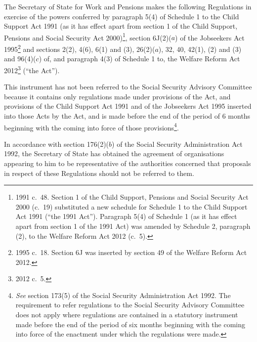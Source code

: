 \documentclass[12pt,a4paper]{article}
\title{\regstitle}
\author{S.I.\ 2013 No.\ 630}
\date{Made
13th March 2013\\
Laid before Parliament
18th March 2013\\
Coming into force
29th April 2013
}
\begin{document}
\maketitle

\enlargethispage{\baselineskip}

\noindent
The Secretary of State for Work and Pensions makes the following Regulations in exercise of the powers conferred by paragraph 5(4) of Schedule 1 to the Child Support Act 1991 (as it has effect apart from section 1 of the Child Support, Pensions and Social Security Act 2000)\footnote{1991 c.~48. Section 1 of the Child Support, Pensions and Social Security Act 2000 (c.~19) substituted a new schedule for Schedule 1 to the Child Support Act 1991 (“the 1991 Act”). Paragraph 5(4) of Schedule 1 (as it has effect apart from section 1 of the 1991 Act) was amended by Schedule 2, paragraph (2), to the Welfare Reform Act 2012 (c.~5).}, section 6J(2)($a$)  of the Jobseekers Act 1995\footnote{1995 c.~18. Section 6J was inserted by section 49 of the Welfare Reform Act 2012.} and sections 2(2), 4(6), 6(1) and (3), 26(2)($a$), 32, 40, 42(1), (2) and (3) and 96(4)($c$)  of, and paragraph 4(3) of Schedule 1 to, the Welfare Reform Act 2012\footnote{2012 c.~5.} (“the Act”).

This instrument has not been referred to the Social Security Advisory Committee because it contains only regulations made under provisions of the Act, and provisions of the Child Support Act 1991 and of the Jobseekers Act 1995 inserted into those Acts by the Act, and is made before the end of the period of 6 months beginning with the coming into force of those provisions\footnote{\emph{See} section 173(5) of the Social Security Administration Act 1992. The requirement to refer regulations to the Social Security Advisory Committee does not apply where regulations are contained in a statutory instrument made before the end of the period of six months beginning with the coming into force of the enactment under which the regulations were made.}.

In accordance with section 176(2)($b$)  of the Social Security Administration Act 1992, the Secretary of State has obtained the agreement of organisations appearing to him to be representative of the authorities concerned that proposals in respect of these Regulations should not be referred to them. 

{\sloppy

\tableofcontents

}

\bigskip
\end{document}
